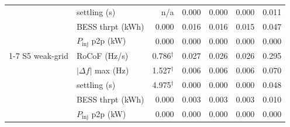\begin{table}[t]
\begin{tabular}{llrrrrr}
   & settling (s) & n/a & 0.000 & 0.000 & 0.000 & 0.011 \\
   & BESS thrpt (kWh) & 0.000 & 0.016 & 0.016 & 0.015 & 0.047 \\
   & $P_\mathrm{inj}$ p2p (kW) & 0.000 & 0.000 & 0.000 & 0.000 & 0.000 \\
  \cmidrule(lr){1-7}
  S5 weak-grid & RoCoF (Hz/s) & 0.786$^\dagger$ & 0.027 & 0.026 & 0.026 & 0.295 \\
   & $|\Delta f|$ max (Hz) & 1.527$^\dagger$ & 0.006 & 0.006 & 0.006 & 0.070 \\
   & settling (s) & 4.975$^\dagger$ & 0.000 & 0.000 & 0.000 & 0.048 \\
   & BESS thrpt (kWh) & 0.000 & 0.003 & 0.003 & 0.003 & 0.010 \\
   & $P_\mathrm{inj}$ p2p (kW) & 0.000 & 0.000 & 0.000 & 0.000 & 0.000 \\
\bottomrule
\end{tabular}
\end{table}
